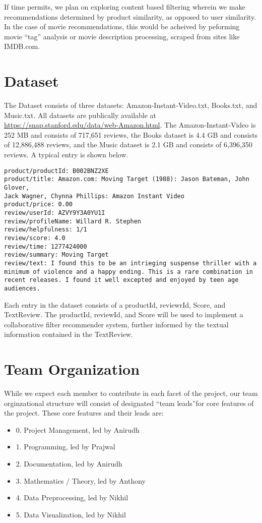 \documentclass{article} %
\begin{document}
If time permits, we plan on exploring content based filtering wherein we make recommendations determined by product similarity, as opposed to user similarity. In the case of movie recommendations, this would be acheived by peforming movie ``tag'' analysis or movie description processing, scraped from sites like IMDB.com. 

\section{Dataset}

The Dataset consists of three datasets: Amazon-Instant-Video.txt, Books.txt, and Music.txt. All datasets are publically available at \url{https://snap.stanford.edu/data/web-Amazon.html}. The Amazon-Instant-Video is 252 MB and consists of 717,651 reviews, the Books dataset is 4.4 GB and consists of 12,886,488 reviews, and the Music dataset is 2.1 GB and consists of 6,396,350 reviews. A typical entry is shown below. 

\begin{verbatim}
product/productId: B002BNZ2XE
product/title: Amazon.com: Moving Target (1988): Jason Bateman, John Glover, 
Jack Wagner, Chynna Phillips: Amazon Instant Video
product/price: 0.00
review/userId: AZVY9Y3A0YU1I
review/profileName: Willard R. Stephen
review/helpfulness: 1/1
review/score: 4.0
review/time: 1277424000
review/summary: Moving Target
review/text: I found this to be an intrieging suspense thriller with a 
minimum of violence and a happy ending. This is a rare combination in 
recent releases. I found it well excepted and enjoyed by teen age 
audiences.
\end{verbatim}

Each entry in the dataset consists of a productId, reviewrId, Score, and TextReview. The productId, reviewId, and Score will be used to implement a collaborative filter recommender system, further informed by the textual information contained in the TextReview. 


\section{Team Organization}
While we expect each member to contribute in each facet of the project, our team orginzational structure will consist of designated ``team leads''for core features of the project. These core features and their leads are:

\begin{itemize}
	\item[] 0. Project Management, led by Anirudh
	\item[] 1. Programming, led by Prajwal
	\item[] 2. Documentation, led by Anirudh
	\item[] 3. Mathematics / Theory, led by Anthony
	\item[] 4. Data Preprocessing, led by Nikhil
	\item[] 5. Data Visualization, led by Nikhil
\end{itemize}
\end{document}

